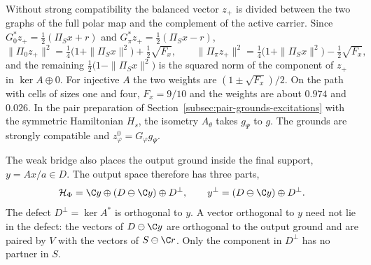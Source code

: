 Without strong compatibility the balanced vector $z_+$ is divided between the two graphs of the full polar map and the complement of the active carrier. Since $G_0^*z_+=\tfrac12(\Pi_Sx+r)$ and $G_\pi^*z_+=\tfrac12(\Pi_Sx-r)$,
\begin{equation}
 \|\Pi_0z_+\|^2=\tfrac14\bigl(1+\|\Pi_Sx\|^2\bigr)+\tfrac12\sqrt{F_x},\qquad
 \|\Pi_\pi z_+\|^2=\tfrac14\bigl(1+\|\Pi_Sx\|^2\bigr)-\tfrac12\sqrt{F_x},
 \label{eq:ground-plane-graph-weights}
\end{equation}
and the remaining $\tfrac12\bigl(1-\|\Pi_Sx\|^2\bigr)$ is the squared norm of the component of $z_+$ in $\ker A\oplus0$. For injective $A$ the two weights are $(1\pm\sqrt{F_x})/2$. On the path with cells of sizes one and four, $F_x=9/10$ and the weights are about $0.974$ and $0.026$. In the pair preparation of Section~\ref{subsec:pair-grounds-excitations} with the symmetric Hamiltonian $H_s$, the isometry $A_\theta$ takes $g_\Psi$ to $g$. The grounds are strongly compatible and $z^0_\varphi=G_\varphi g_\Psi$.

The weak bridge also places the output ground inside the final support, $y=Ax/a\in D$. The output space therefore has three parts,
\begin{equation}
 \mathcal H_\Phi=\C y\oplus(D\ominus\C y)\oplus D^\perp,\qquad
 y^\perp=(D\ominus\C y)\oplus D^\perp .
 \label{eq:ground-plane-three-parts}
\end{equation}
The defect $D^\perp=\ker A^*$ is orthogonal to $y$. A vector orthogonal to $y$ need not lie in the defect: the vectors of $D\ominus\C y$ are orthogonal to the output ground and are paired by $V$ with the vectors of $S\ominus\C r$. Only the component in $D^\perp$ has no partner in $S$.
